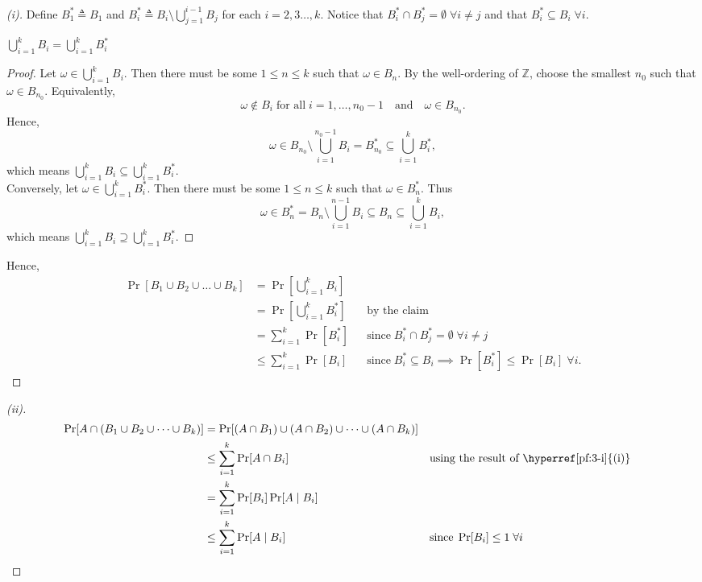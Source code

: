 \begin{proof}[(i)]
    \label{pf:3-i}
    Define $B_1^\ast\triangleq B_1$ and $B_i^\ast \triangleq B_i\setminus \bigcup_{j=1}^{i-1} B_j$ for each $i=2,3\ldots,k$. Notice that $B_i^\ast \cap B_j^\ast =\emptyset \; \forall i\neq j$ and that $B_i^\ast\subseteq B_i \; \forall i$.
    \begin{claim}\label{clm:i-1}
        $\bigcup_{i=1}^{k} B_i=\bigcup_{i=1}^{k} B_i^\ast$
    \end{claim}
    \begin{proof}
        Let $\omega\in \bigcup_{i=1}^{k} B_i$. Then there must be some $1\le n\le k$ such that $\omega\in B_n$. By the well-ordering of $\mathbb{Z}$, choose the smallest $n_0$ such that $\omega\in B_{n_0}$. Equivalently,
        \[
        \omega\notin B_i\; \text{for all}\; i=1,\ldots,n_0-1\quad \text{and}\quad \omega\in B_{n_0}.
        \]
        Hence,
        \[
        \omega \in B_{n_0}\setminus \bigcup_{i=1}^{n_0-1} B_i = B_{n_0}^\ast \subseteq \bigcup_{i=1}^{k} B_i^\ast,
        \]
        which means $\bigcup_{i=1}^{k} B_i\subseteq \bigcup_{i=1}^{k} B_i^\ast$.\\
        Conversely, let $\omega\in \bigcup_{i=1}^{k} B_i^\ast$. Then there must be some $1\le n\le k$ such that $\omega\in B_n^\ast$. Thus
        \[
        \omega\in B_n^\ast=B_{n}\setminus \bigcup_{i=1}^{n-1} B_i\subseteq B_n\subseteq  \bigcup_{i=1}^{k} B_i,
        \]
        which means $\bigcup_{i=1}^{k} B_i\supseteq \bigcup_{i=1}^{k} B_i^\ast$.
    \end{proof}
    Hence,
    \begin{align*}
        \Pr[ B_1\cup B_2\cup \dots \cup B_k] &=\Pr\left[\bigcup_{i=1}^k B_i\right]\\
        &= \Pr\left[\bigcup_{i=1}^k B_i^\ast\right] && \text{by the claim}\\
        &= \sum_{i=1}^k \Pr[B_i^\ast] && \text{since} \; B_i^\ast \cap B_j^\ast =\emptyset \; \forall i\neq j\\
        &\le  \sum_{i=1}^k \Pr[B_i] && \text{since} \; B_i^\ast \subseteq B_i\implies \Pr[B_i^\ast] \le \Pr[B_i] \; \forall i.
    \end{align*}
\end{proof}

\begin{proof}[(ii)]
    \begin{align*}
        \Pr[ A \cap (B_1\cup B_2\cup \dots \cup B_k)]
        &= \Pr[ (A \cap B_1)\cup (A\cap B_2) \cup \dots \cup (A \cap B_k)]\\
        &\le \sum_{i=1}^k\Pr[A\cap B_i] && \text{using the result of \hyperref[pf:3-i]{(i)}}\\
        &= \sum_{i=1}^k\Pr[B_i]\Pr[A\mid B_i]\\
        &\le \sum_{i=1}^k\Pr[A\mid B_i] && \text{since} \; \Pr[B_i]\le 1\; \forall i
    \end{align*}
\end{proof}

